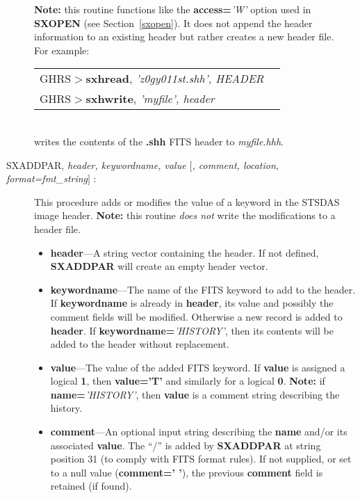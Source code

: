 \begin{description}
\noindent
{\bf Note:} this 
routine functions like the {\bf access=}{\it 'W'}
option used in {\bf SXOPEN} (see Section~\ref{sxopen}).  It does not append 
the header information to an existing header but rather creates a new header
file.\\

\noindent
For example:\\

\begin{tabular}{ll}
GHRS$>${\bf sxhread}, {\it 'z0gy011st.shh', HEADER} & \\
GHRS$>${\bf sxhwrite}, {\it 'myfile', header} & \\
\end{tabular}\\

\noindent
writes the contents of the {\bf .shh} FITS header to {\it myfile.hhh}.

\item [SXADDPAR, {\it header, keywordname, value $[$, comment, location, 
format=fmt\_string$]$} :] 

This procedure adds or modifies the value of a keyword in the STSDAS image header.
{\bf Note:} this routine {\it does not} write the modifications to a header file.

\begin{itemize}

\item {\bf header}---A string vector containing the header.
If not defined, {\bf SXADDPAR} will create an empty header vector.

\item {\bf keywordname}---The name of the FITS keyword to add to the header.  
If {\bf keywordname} is already 
in {\bf header}, its value and possibly the comment 
fields will be modified. Otherwise a new record is added to {\bf header}.
If {\bf keywordname=}{\it 'HISTORY'}, then its contents will be added to the header 
without replacement.

\item {\bf value}---The value of the added FITS keyword. If {\bf value} 
is assigned a logical {\bf 1}, then {\bf value='T'} and similarly for 
a logical {\bf 0}.  {\bf Note:} if {\bf name=}{\it 'HISTORY'}, then 
{\bf value} is a comment string describing the history.

\item {\bf comment}---An optional input string describing the {\bf name} and/or
its associated {\bf value}.  The ``/'' is added by {\bf SXADDPAR} at 
string position 31 (to comply with FITS format rules).  If not supplied, or 
set to a null value ({\bf comment=' '}), the previous {\bf comment} field 
is retained (if found).


\end{itemize}
\end{description}
